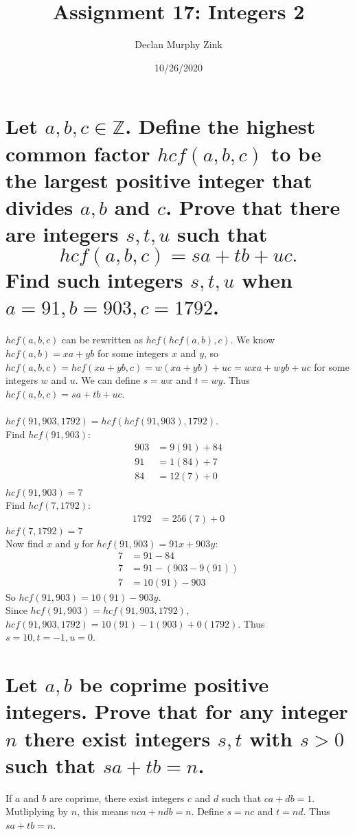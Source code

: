 \documentclass[12pt]{article}
\begin{document}
\title{Assignment 17: Integers 2}
\author{Declan Murphy Zink}
\date{10/26/2020}
\maketitle

\setcounter{section}{5}

\section{
    Let $a,b,c \in \mathds{Z}$. Define the highest common factor $hcf(a,b,c)$ to be the largest positive integer that divides $a,b$ and $c$.
    Prove that there are integers $s,t,u$ such that $$hcf(a,b,c) = sa + tb + uc.$$
    Find such integers $s,t,u$ when $a=91,b=903,c=1792$.
}
$hcf(a,b,c)$ can be rewritten as $hcf(hcf(a,b),c)$. We know $hcf(a,b) = xa+yb$ for some integers $x$ and $y$,
so $hcf(a,b,c) = hcf(xa+yb,c) = w(xa + yb) + uc = wxa + wyb + uc$ for some integers $w$ and $u$.
We can define $s=wx$ and $t=wy$. Thus $hcf(a,b,c) = sa + tb + uc$.\\\\
$hcf(91,903,1792) = hcf(hcf(91,903),1792)$.\\
Find $hcf(91,903)$:
\begin{align*}
    903 &= 9(91)+84\\
    91 &= 1(84) + 7\\
    84 &= 12(7) + 0\\
\end{align*}
$hcf(91,903) = 7$\\
Find $hcf(7,1792)$:
\begin{align*}
    1792 &= 256(7) + 0
\end{align*}
$hcf(7,1792) = 7$\\
Now find $x$ and $y$ for $hcf(91,903) = 91x + 903y$:
\begin{align*}
    7 &= 91-84\\
    7 &= 91-(903-9(91))\\
    7 &= 10(91)-903
\end{align*}
So $hcf(91,903) = 10(91) - 903y$.\\
Since $hcf(91,903) = hcf(91,903,1792)$, $hcf(91,903,1792) = 10(91) -1(903) + 0(1792)$.
Thus $s = 10, t = -1, u = 0$.

\setcounter{section}{8}

\section{
    Let $a,b$ be coprime positive integers. Prove that for any integer $n$ there exist integers $s,t$
    with $s > 0$ such that $sa + tb = n$.
}
If $a$ and $b$ are coprime, there exist integers $c$ and $d$ such that $ca+db=1$.
Mutliplying by $n$, this means $nca+ndb=n$. Define $s=nc$ and $t=nd$.
Thus $sa+tb=n$.
\end{document}
